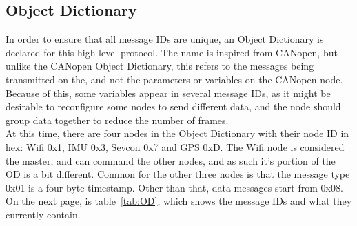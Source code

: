 \subsection{Object Dictionary}\label{sub:OD}
In order to ensure that all message IDs are unique, an Object Dictionary is declared for this high level protocol.
The name is inspired from CANopen, but unlike the CANopen Object Dictionary, this refers to the messages being transmitted on the, and not the parameters or variables on the CANopen node.
Because of this, some variables appear in several message IDs, as it might be desirable to reconfigure some nodes to send different data, and the node should group data together to reduce the number of frames.\\

At this time, there are four nodes in the Object Dictionary with their node ID in hex: Wifi 0x1, IMU 0x3, Sevcon 0x7 and GPS 0xD.
The Wifi node is considered the master, and can command the other nodes, and as such it's portion of the OD is a bit different. 
Common for the other three nodes is that the message type 0x01 is a four byte timestamp.
Other than that, data messages start from 0x08.\\

On the next page, is table~\ref{tab:OD}, which shows the message IDs and what they currently contain.

